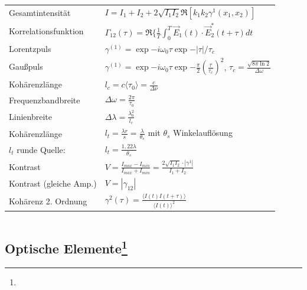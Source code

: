 \documentclass[12pt,a4paper]{article}
\newcommand{\abs}[1]{\left| #1 \right|}
\renewcommand{\=}[1]{\stackrel{#1}{=}}
\newcommand{\erw}[1]{\langle #1 \rangle}
\theoremstyle{definition}
\theoremstyle{remark}
\begin{document}
\begin{center}
\begin{minipage}[t]{.55\linewidth}
\vspace{0pt}
\noindent\begin{tabular}{ll}
Gesamtintensität & $I = I_1 + I_2 + 2 \sqrt{I_1 I_2} \Re[k_1 k_2 \gamma^1 (x_1, x_2)]$\\
Korrelationsfunktion & $\Gamma_{12}(\tau) = \Re \{ \frac{1}{T} \int_0^T \vec E_1(t) \cdot \vec E_2^*(t + \tau) dt$\\
Lorentzpuls & $\gamma^{(1)} = \exp{-i \omega_0 \tau} \exp{-\abs{\tau} / \tau_c}$\\
Gaußpuls & $\gamma^{(1)} = \exp{-i \omega_0 \tau} \exp{-\frac{\pi}{2} (\frac{\tau}{\tau_c})^2}$, $\tau_c = \frac{\sqrt{8 \pi \ln 2}}{\Delta \omega}$\\
Kohärenzlänge & $l_c = c \langle \tau_0 \rangle = \frac{c}{\Delta \nu}$\\
Frequenzbandbreite &  $\Delta \omega = \frac{2\pi}{\tau_0}$\\
Linienbreite &  $\Delta \lambda = \frac{\lambda_0^2}{l_c}$\\
Kohärenzlänge & $l_t = \frac{\lambda r}{s} = \frac{\lambda}{\theta_s}$ mit $\theta_s$ Winkelauflösung\\
$l_t$ runde Quelle: & $l_t = \frac{1,22 \lambda}{\theta_s}$\\
Kontrast &  $V = \frac{I_{max} - I_{min}}{I_{max} + I_{min}} = \frac{2\sqrt{I_1 I_2} \cdot \abs{\gamma^1}}{I_1 + I_2}$\\
Kontrast (gleiche Amp.) & $V = \abs{\gamma_{12}}$\\
Kohärenz 2. Ordnung & $\gamma^{2}(\tau) = \frac{\erw{I(t) I(t+\tau)}}{\erw{I(t)}^2}$\\
\end{tabular}
\end{minipage}%
\begin{minipage}[t]{.44\linewidth}
\vspace{0pt}
\begin{tabular}{ll}

\end{tabular}
\end{minipage}
\end{center}

\subsection[Optische Elemente]{Optische Elemente\let\thefootnote\relax\footnote{}}
\end{document}
